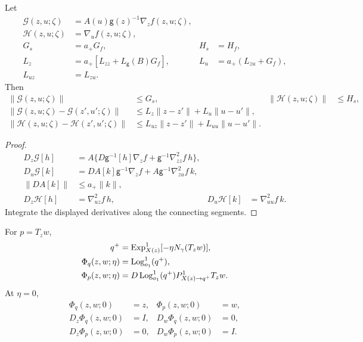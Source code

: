 \begin{lemma}
Let
\begin{align}
 \mathcal G(z,u;\zeta)&=A(u)\mathsf g(z)^{-1}\nabla_zf(z,u;\zeta),\\
 \mathcal H(z,u;\zeta)&=\nabla_uf(z,u;\zeta),\\
 G_s&=a_+G_f,&H_s&=H_f,\\
 L_z&=a_+[L_{zz}+L_{\mathsf g}(B)G_f],&
 L_u&=a_+(L_{zu}+G_f),\\
 L_{uz}&=L_{zu}.&&
\end{align}
Then
\begin{align}
 \|\mathcal G(z,u;\zeta)\|&\le G_s,&\|\mathcal H(z,u;\zeta)\|&\le H_s,\\
 \|\mathcal G(z,u;\zeta)-\mathcal G(z',u';\zeta)\|
 &\le L_z\|z-z'\|+L_u\|u-u'\|,\\
 \|\mathcal H(z,u;\zeta)-\mathcal H(z',u';\zeta)\|
 &\le L_{uz}\|z-z'\|+L_{uu}\|u-u'\|.
\end{align}
\end{lemma}
\begin{proof}
\begin{align}
 D_z\mathcal G[h]
 &=A\{D\mathsf g^{-1}[h]\nabla_zf+\mathsf g^{-1}\nabla_{zz}^2f\,h\},\\
 D_u\mathcal G[k]
 &=DA[k]\mathsf g^{-1}\nabla_zf+A\mathsf g^{-1}\nabla_{zu}^2f\,k,\\
 \|DA[k]\|&\le a_+\|k\|,\\
 D_z\mathcal H[h]&=\nabla_{uz}^2f\,h,&
 D_u\mathcal H[k]&=\nabla_{uu}^2f\,k.
\end{align}
Integrate the displayed derivatives along the connecting segments.
\end{proof}

\begin{definition}
For $p=T_zw$,
\begin{align}
 q^+&=\operatorname{Exp}_{X(z)}^1[-\eta N_\gamma(T_zw)],\\
 \Phi_q(z,w;\eta)&=\operatorname{Log}_{o_1}^1(q^+),\\
 \Phi_p(z,w;\eta)&=D\operatorname{Log}_{o_1}^1(q^+)
 P^1_{X(z)\to q^+}T_zw.
\end{align}
At $\eta=0$,
\begin{align}
 \Phi_q(z,w;0)&=z,&\Phi_p(z,w;0)&=w,\\
 D_z\Phi_q(z,w;0)&=I,&D_w\Phi_q(z,w;0)&=0,\\
 D_z\Phi_p(z,w;0)&=0,&D_w\Phi_p(z,w;0)&=I.
\end{align}
\end{definition}


